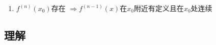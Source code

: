 \documentclass[../book.tex]{subfiles}
\begin{document}
\begin{enumerate}
\begin{itemize}
\begin{enumerate}[label=(\alph*)]
                \item 若 $f(x_0) = 0$，则：
                \[
                    \begin{cases}
                        f'(x_0) = 0
                        \;\Rightarrow\;
                        |f(x)| \text{ 在 } x_0 \text{ 处可导，且 }
                        \left.(|f(x)|)'\right\Big|_{x=x_0} = 0, \\[0.5em]
                        f'(x_0) \neq 0
                        \;\Rightarrow\;
                        |f(x)| \text{ 在 } x_0 \text{ 处{\color{red}{不可导}}}.
                    \end{cases}
                \]
                \item 总结不可导即:
                \[
                    \left.
                    \begin{aligned}
                        & f(x) \text{ 在 } x_0 \text{ 处可导} \\
                        & f(x_0) = 0 \\
                        & f'(x_0) \neq 0
                    \end{aligned}
                    \right\}
                    \;\Longrightarrow\;
                    |f(x)| \text{ 在 } x_0 \text{ 处 {\color{red}{不可导}}}
                \]
            \end{enumerate}
        \end{itemize}
        \item $f^{(n)}(x_0)$存在 $\Rightarrow f^{(n - 1)}(x)$在$x_0$附近有定义且在$x_0$处连续
    \end{enumerate}

    \subsection{理解}
\end{document}
